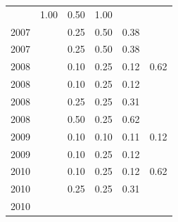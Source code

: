 \begin{table}[H]
\begin{tabular}{| l | c | c | c | c | c |}
          &
          1.00
          &
          0.50
          &
          1.00
          &
          \\
            2007
          &
          
          &
          0.25
          &
          0.50
          &
          0.38
          &
          \\
            2007
          &
          
          &
          0.25
          &
          0.50
          &
          0.38
          &
          \\
\hline
            2008
          &
          
          &
          0.10
          &
          0.25
          &
          0.12
          &
            {\color{blue} 0.62}
          \\
            2008
          &
          
          &
          0.10
          &
          0.25
          &
          0.12
          &
          \\
            2008
          &
          
          &
          0.25
          &
          0.25
          &
          0.31
          &
          \\
            2008
          &
          
          &
          0.50
          &
          0.25
          &
          0.62
          &
          \\
\hline
            2009
          &
          
          &
          0.10
          &
          0.10
          &
          0.11
          &
            {\color{red} 0.12}
          \\
            2009
          &
          
          &
          0.10
          &
          0.25
          &
          0.12
          &
          \\
\hline
            2010
          &
          
          &
          0.10
          &
          0.25
          &
          0.12
          &
            {\color{blue} 0.62}
          \\
            2010
          &
          
          &
          0.25
          &
          0.25
          &
          0.31
          &
          \\
            2010
          &
          

\end{tabular}
\end{table}
